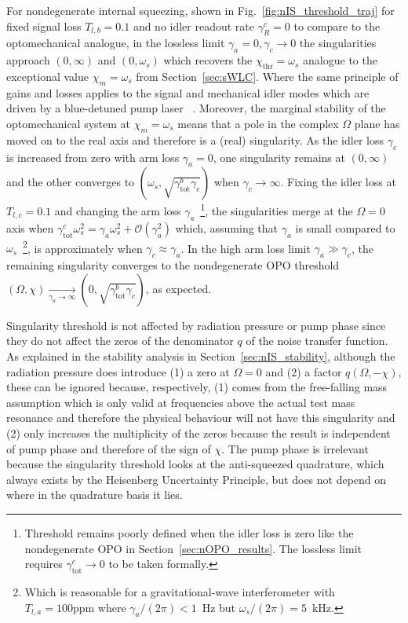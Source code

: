 For nondegenerate internal squeezing, shown in Fig.~\ref{fig:nIS_threshold_traj} for fixed signal loss $T_{l,b}=0.1$  and no idler readout rate $\gamma^c_R=0$ to compare to the optomechanical analogue, in the lossless limit $\gamma_a=0,\gamma_c\rightarrow0$ the singularities approach $(0,\infty)$ and $(0,\omega_s)$ which recovers the $\chi_\text{thr}=\omega_s$ analogue to the exceptional value $\chi_m=\omega_s$ from Section~\ref{sec:sWLC}. Where the same principle of gains and losses applies to the signal and mechanical idler modes which are driven by a blue-detuned pump laser~\cite{} . Moreover, the marginal stability of the optomechanical system at $\chi_m=\omega_s$ means that a pole in the complex $\Omega$ plane has moved on to the real axis and therefore is a (real) singularity. As the idler loss $\gamma_c$ is increased from zero with arm loss $\gamma_a=0$, one singularity remains at $(0,\infty)$ and the other converges to $(\omega_s,\sqrt{\gamma^b_\text{tot}\gamma_c})$ when $\gamma_c\rightarrow\infty$. Fixing the idler loss at $T_{l,c}=0.1$ and changing the arm loss $\gamma_a$~\footnote{Threshold remains poorly defined when the idler loss is zero  like the nondegenerate OPO in Section~\ref{sec:nOPO_results}. The lossless limit requires $\gamma^c_\text{tot}\rightarrow0$ to be taken formally.}, the singularities merge  at the $\Omega=0$ axis when $\gamma^c_\text{tot}\omega_s^2=\gamma_a\omega_s^2+\mathcal{O}(\gamma_a^2)$ which, assuming that $\gamma_a$ is small compared to $\omega_s$~\footnote{Which is reasonable for a gravitational-wave interferometer with $T_{l,a}=100\text{ppm}$ where $\gamma_a/(2\pi)<1$~Hz but $\omega_s/(2\pi)=5$~kHz.}, is approximately  when $\gamma_c\approx\gamma_a$. In the high arm loss limit $\gamma_a\gg\gamma_c$, the remaining singularity converges to the nondegenerate OPO threshold $(\Omega,\chi)\xrightarrow[\gamma_a\rightarrow\infty]{}(0,\sqrt{\gamma^b_\mathrm{tot}\gamma_c})$, as expected.

Singularity threshold is not affected by radiation pressure or pump phase since they do not affect the zeros of the denominator $q$ of the noise transfer function. As explained in the stability analysis in Section~\ref{sec:nIS_stability}, although the radiation pressure does introduce (1) a zero at $\Omega=0$ and (2) a factor $q(\Omega,-\chi)$, these can be ignored because, respectively, (1) comes from the free-falling mass assumption which is only valid at frequencies above the actual test mass resonance and therefore the physical behaviour will not have this singularity and (2) only increases the multiplicity of the zeros because the result is independent of pump phase and therefore of the sign of $\chi$. The pump phase is irrelevant because the singularity threshold looks at the anti-squeezed quadrature, which always exists by the Heisenberg Uncertainty Principle, but does not depend on where in the quadrature basis it lies.


